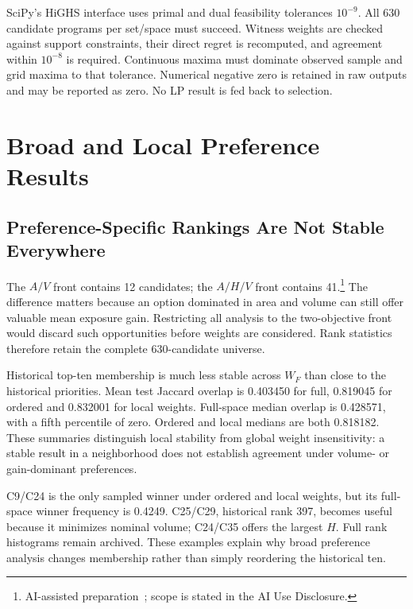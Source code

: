 \documentclass{llncs}
\newcommand{\aidraft}{\footnote{AI-assisted preparation~\cite{openai2026}; scope is stated in the AI Use Disclosure.}}
\begin{document}
SciPy's HiGHS interface uses primal and dual feasibility tolerances $10^{-9}$. All 630 candidate programs per set/space must succeed. Witness weights are checked against support constraints, their direct regret is recomputed, and agreement within $10^{-8}$ is required. Continuous maxima must dominate observed sample and grid maxima to that tolerance. Numerical negative zero is retained in raw outputs and may be reported as zero. No LP result is fed back to selection.

\section{Broad and Local Preference Results}
\subsection{Preference-Specific Rankings Are Not Stable Everywhere}
The $A/V$ front contains 12 candidates; the $A/H/V$ front contains 41.\aidraft{} The difference matters because an option dominated in area and volume can still offer valuable mean exposure gain. Restricting all analysis to the two-objective front would discard such opportunities before weights are considered. Rank statistics therefore retain the complete 630-candidate universe.

Historical top-ten membership is much less stable across $W_F$ than close to the historical priorities. Mean test Jaccard overlap is 0.403450 for full, 0.819045 for ordered and 0.832001 for local weights. Full-space median overlap is 0.428571, with a fifth percentile of zero. Ordered and local medians are both 0.818182. These summaries distinguish local stability from global weight insensitivity: a stable result in a neighborhood does not establish agreement under volume- or gain-dominant preferences.

C9/C24 is the only sampled winner under ordered and local weights, but its full-space winner frequency is 0.4249. C25/C29, historical rank 397, becomes useful because it minimizes nominal volume; C24/C35 offers the largest $H$. Full rank histograms remain archived. These examples explain why broad preference analysis changes membership rather than simply reordering the historical ten.
\end{document}
